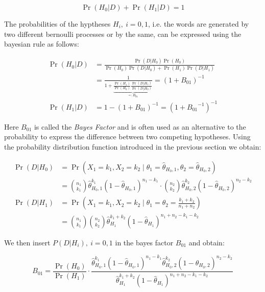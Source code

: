 \begin{equation*}
	\Pr(H_0|D) + \Pr(H_1|D) = 1
\end{equation*}

The probabilities of the hyptheses $H_i,~i=0,1$, i.e. the words are generated by
two different bernoulli processes or by the same, can be expressed using the
bayesian rule as follows:

\begin{equation*}
\begin{split}
	\Pr(H_0|D) &= \frac{\Pr(D|H_0)\Pr(H_0)}{\Pr(H_0)\Pr(D|H_0) + \Pr(H_1)\Pr(D|H_1)} \\
			 & =\frac{1}{1+
			 \underbrace{\frac{\Pr(H_1)}{\Pr(H_0)}\frac{\Pr(D|H_1)}{\Pr(D|H_0)}}_{
			 \eqqcolon B_{01}}} = (1+B_{01})^{-1} \\
    \Pr(H_1|D) &= 1 - (1 + B_{01})^{-1}= \left(1+{B_{01}}^{-1}\right)^{-1}
\end{split}
\end{equation*}

Here $B_{01}$ is called the \emph{Bayes Factor} and is often used as an
alternative to the probability to express the difference between two competing hypotheses.
Using the probability distribution function introduced  in the previous
section we obtain: 

\begin{equation*}
\begin{split}
\Pr(D|H_0) &= \Pr\left(X_1=k_1, X_2=k_2 \mid \theta_1 = \hat{\theta}_{H_0,1},
\theta_2 = \hat{\theta}_{H_0,2}\right) \\
&=
\binom{n_1}{k_1}\hat{\theta}_{H_0,1}^{k_1}\left(1-\hat{\theta}_{H_0,1}\right)^{n_1-k_1}
\cdot
	\binom{n_2}{k_2}\hat{\theta}_{H_0,2}^{k_2}\left(1-\hat{\theta}_{H_0,2}\right)^{n_2-k_2} 
\\
\Pr(D|H_1) &= \Pr\left(X_1=k_1, X_2=k_2 \mid \theta_1 = \theta_2 = \frac{k_1 +
k_2}{n_1 + n_2}\right) \\
&= \binom{n_1}{k_1}\binom{n_2}{k_2}\hat{\theta}_{H_1}^{k_1 +
k_2}\left(1-\hat{\theta}_{H_1}\right)^{n_1 + n_2 - k_1 - k_2}
\end{split}
\end{equation*}

We then insert $P(D|H_i),~i=0,1$ in the bayes factor $B_{01}$ and obtain:

\begin{equation*}
B_{01} = \frac{\Pr(H_0)}{\Pr(H_1)} \cdot
\frac{\hat{\theta}_{H_0,1}^{k_1}\left(1-\hat{\theta}_{H_0,1}\right)^{n_1-k_1}\hat{\theta}_{H_0,2}^{k_2}\left(1-\hat{\theta}_{H_0,2}\right)^{n_2-k_2}
}{\hat{\theta}_{H_1}^{k_1 + k_2}\left(1-\hat{\theta}_{H_1}\right)^{n_1 +
n_2 - k_1 - k_2}}
\end{equation*}

